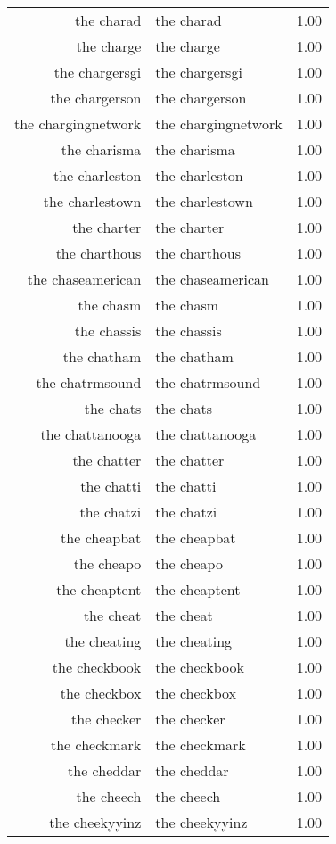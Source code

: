 \begin{table}[ht]
\begin{tabular}{rlr}
  the charad & the charad & 1.00 \\ 
  the charge & the charge & 1.00 \\ 
  the chargersgi & the chargersgi & 1.00 \\ 
  the chargerson & the chargerson & 1.00 \\ 
  the chargingnetwork & the chargingnetwork & 1.00 \\ 
  the charisma & the charisma & 1.00 \\ 
  the charleston & the charleston & 1.00 \\ 
  the charlestown & the charlestown & 1.00 \\ 
  the charter & the charter & 1.00 \\ 
  the charthous & the charthous & 1.00 \\ 
  the chaseamerican & the chaseamerican & 1.00 \\ 
  the chasm & the chasm & 1.00 \\ 
  the chassis & the chassis & 1.00 \\ 
  the chatham & the chatham & 1.00 \\ 
  the chatrmsound & the chatrmsound & 1.00 \\ 
  the chats & the chats & 1.00 \\ 
  the chattanooga & the chattanooga & 1.00 \\ 
  the chatter & the chatter & 1.00 \\ 
  the chatti & the chatti & 1.00 \\ 
  the chatzi & the chatzi & 1.00 \\ 
  the cheapbat & the cheapbat & 1.00 \\ 
  the cheapo & the cheapo & 1.00 \\ 
  the cheaptent & the cheaptent & 1.00 \\ 
  the cheat & the cheat & 1.00 \\ 
  the cheating & the cheating & 1.00 \\ 
  the checkbook & the checkbook & 1.00 \\ 
  the checkbox & the checkbox & 1.00 \\ 
  the checker & the checker & 1.00 \\ 
  the checkmark & the checkmark & 1.00 \\ 
  the cheddar & the cheddar & 1.00 \\ 
  the cheech & the cheech & 1.00 \\ 
  the cheekyyinz & the cheekyyinz & 1.00 \\ 

\end{tabular}
\end{table}
